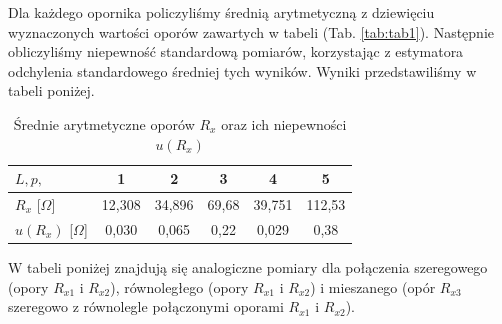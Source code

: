 \documentclass[12pt,a4paper]{article}
\numberwithin{equation}{section}
\begin{document}
Dla każdego opornika policzyliśmy średnią arytmetyczną z dziewięciu wyznaczonych wartości oporów zawartych w tabeli (Tab. \ref{tab:tab1}). Następnie obliczyliśmy niepewność standardową pomiarów, korzystając z estymatora odchylenia standardowego średniej tych wyników. Wyniki przedstawiliśmy w tabeli poniżej.

\begin{table}[!ht]
	\caption{Średnie arytmetyczne oporów $R_x$ oraz ich niepewności $u(R_x)$}
	\begin{center}
		\begin{tabular}{l||c|c|c|c|c}
			\hline
			$L,p,$ & 1 & 2 & 3 & 4 & 5 \\ \hline
			$R_x$ [$\Omega$] & 12,308 & 34,896 & 69,68 & 39,751 & 112,53  \\
			$u(R_{x})$ [$\Omega$] & 0,030 & 0,065 & 0,22 & 0,029 & 0,38 \\ \hline
		\end{tabular}
	\end{center}
	\label{tab:tab2}
\end{table}

W tabeli poniżej znajdują się analogiczne pomiary dla połączenia szeregowego (opory $R_{x1}$ i $R_{x2}$), równoległego (opory $R_{x1}$ i $R_{x2}$) i mieszanego (opór $R_{x3}$ szeregowo z równolegle połączonymi oporami $R_{x1}$ i $R_{x2}$).
\end{document}
